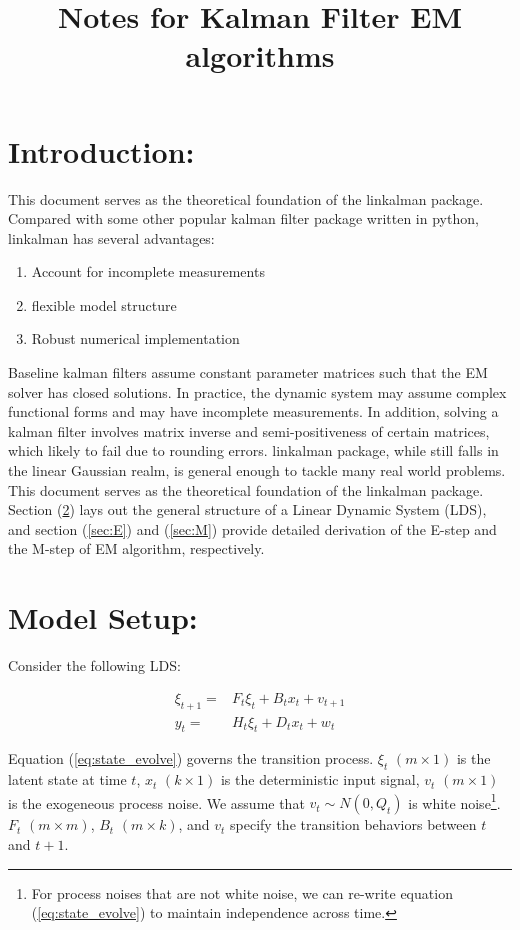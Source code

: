 \documentclass[12pt]{article}
\newenvironment{boenumerate}
    {\begin{enumerate}\renewcommand\labelenumi{\textbf\theenumi}}
    {\end{enumerate}}
\numberwithin{equation}{section}
\begin{document}
\title{Notes for Kalman Filter EM algorithms}

\section{Introduction:}

This document serves as the theoretical foundation of the linkalman package. Compared with some other popular kalman filter package written in python, linkalman has several advantages:

\begin{boenumerate}
    \item Account for incomplete measurements 
    \item flexible model structure
    \item Robust numerical implementation
\end{boenumerate}

Baseline kalman filters assume constant parameter matrices such that the EM solver has closed solutions. In practice, the dynamic system may assume complex functional forms and may have incomplete measurements. In addition, solving a kalman filter involves matrix inverse and semi-positiveness of certain matrices, which likely to fail due to rounding errors. linkalman package, while still falls in the linear Gaussian realm, is general enough to tackle many real world problems. This document serves as the theoretical foundation of the linkalman package. Section (\ref{sec:model_setup}) lays out the general structure of a Linear Dynamic System (LDS), and section (\ref{sec:E}) and (\ref{sec:M}) provide detailed derivation of the E-step and the M-step of EM algorithm, respectively.

\section{Model Setup:} \label{sec:model_setup}

Consider the following LDS:

\begin{align}
    \xi_{t+1} = & F_{t}\xi_{t} + B_{t}x_t + v_{t+1} \label{eq:state_evolve} \\
    y_t = & H_t\xi_{t} + D_{t}x_t + w_t \label{eq:measure}
\end{align}

Equation (\ref{eq:state_evolve}) governs the transition process. $\xi_t$ $(m\times 1)$ is the latent state at time $t$, $x_t$ $(k\times 1)$ is the deterministic input signal, $v_t$ $(m\times 1)$ is the exogeneous process noise. We assume that $v_t\sim N(0,Q_t)$ is white noise\footnote{For process noises that are not white noise, we can re-write equation (\ref{eq:state_evolve}) to maintain independence across time.}. $F_t$ $(m\times m)$, $B_t$ $(m\times k)$, and $v_t$ specify the transition behaviors between $t$ and $t+1$. 
\end{document}
